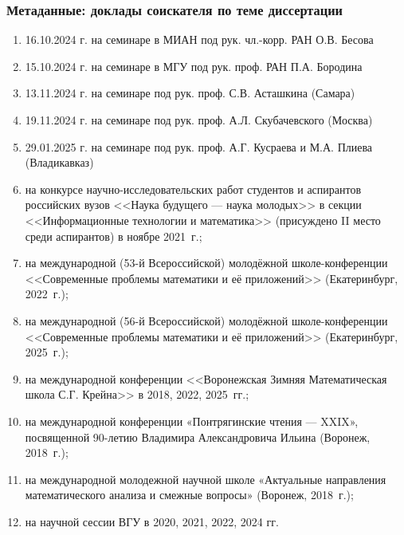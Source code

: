\begin{frame}\frametitle{Метаданные: доклады соискателя по теме диссертации}
	\begin{enumerate}
		\item
			16.10.2024 г. на семинаре в МИАН под рук. чл.-корр. РАН О.В. Бесова
		\item
			15.10.2024 г. на семинаре в МГУ под рук. проф. РАН П.А. Бородина
		\item
			13.11.2024 г. на семинаре под рук. проф. С.В. Асташкина (Самара)
		\item
			19.11.2024 г. на семинаре под рук. проф. А.Л. Скубачевского (Москва)
		\item
			29.01.2025 г. на семинаре под рук. проф. А.Г. Кусраева и М.А. Плиева (Владикавказ)
		\item
			на конкурсе научно-исследовательских работ студентов и аспирантов российских вузов
			<<Наука будущего --- наука молодых>> в секции <<Информационные технологии и математика>>
			(присуждено II место среди аспирантов) в ноябре 2021~г.;
		\item
			на международной (53-й Всероссийской) молодёжной школе-конференции
			<<Современные проблемы математики и её приложений>>
			(Екатеринбург, 2022~г.);
		\item
			на международной (56-й Всероссийской) молодёжной школе-конференции
			<<Современные проблемы математики и её приложений>>
			(Екатеринбург, 2025~г.);
		\item
			на международной конференции <<Воронежская Зимняя Математическая школа С.Г. Крейна>> в 2018, 2022, 2025~гг.;
		\item
			на международной конференции «Понтрягинские чтения — XXIX», посвященной 90-летию Владимира Александровича Ильина (Воронеж, 2018~г.);
		\item
			на международной молодежной научной школе «Актуальные направления математического анализа и смежные вопросы» (Воронеж, 2018~г.);
		\item
			на научной сессии ВГУ в 2020, 2021, 2022, 2024 гг.

	\end{enumerate}
\end{frame}
